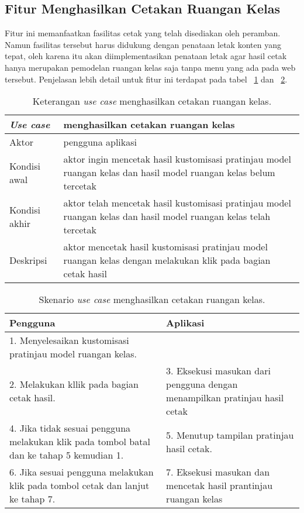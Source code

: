 \subsection{Fitur Menghasilkan Cetakan Ruangan Kelas}
Fitur ini memanfaatkan fasilitas cetak yang telah disediakan oleh peramban. Namun fasilitas tersebut harus didukung dengan penataan letak konten yang tepat, oleh karena itu akan diimplementasikan penataan letak agar hasil cetak hanya merupakan pemodelan ruangan kelas saja tanpa menu yang ada pada web tersebut. Penjelasan lebih detail untuk fitur ini terdapat pada tabel ~\ref{table:fiturcetak1} dan ~\ref{table:fiturcetak2}.
\begin{table}[H]
	\centering
	\begin{tabular}{| m{10em} | m{30em} |} 
	\hline
	\textbf{\textit{Use case}} & \textbf{menghasilkan cetakan ruangan kelas} \\ 
	\hline
	Aktor & pengguna aplikasi  \\ 
	\hline
	Kondisi awal & aktor ingin mencetak hasil kustomisasi pratinjau model ruangan kelas dan hasil model ruangan kelas belum tercetak \\ 
	\hline
	Kondisi akhir & aktor telah mencetak hasil kustomisasi pratinjau model ruangan kelas dan hasil model ruangan kelas telah tercetak \\ 
 	\hline
	Deskripsi & aktor mencetak hasil kustomisasi pratinjau model ruangan kelas dengan melakukan klik pada bagian cetak hasil \\ 
 	\hline
	\end{tabular}
	\caption{Keterangan {\it use case} menghasilkan cetakan ruangan kelas.}
	\label{table:fiturcetak1}
\end{table}

\begin{table}[H]
	\centering
	\begin{tabular}{| m{20em} | m{20em} |} 
	\hline
	\textbf{Pengguna} & \textbf{Aplikasi} \\ 
	\hline
	1. Menyelesaikan kustomisasi pratinjau model ruangan kelas. &  \\ 
	\hline
	2. Melakukan kllik pada bagian cetak hasil. &  3. Eksekusi masukan dari pengguna dengan menampilkan pratinjau hasil cetak \\ 
	\hline
	4. Jika tidak sesuai pengguna melakukan klik pada tombol batal dan ke tahap 5 kemudian 1. & 5. Menutup tampilan pratinjau hasil cetak. \\ 
	\hline
	6. Jika sesuai pengguna melakukan klik pada tombol cetak dan lanjut ke tahap 7. &  7. Eksekusi masukan dan mencetak hasil prantinjau ruangan kelas \\ 
 	\hline
	\end{tabular}
	\caption{Skenario {\it use case} menghasilkan cetakan ruangan kelas.}
	\label{table:fiturcetak2}
\end{table}



